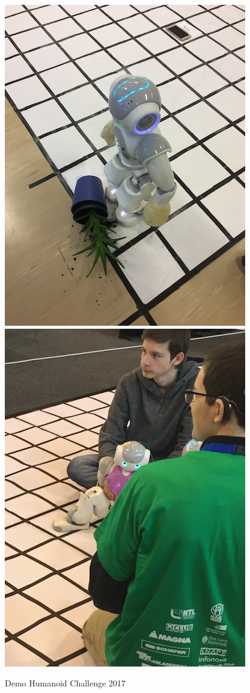 \documentclass[11pt]{article}
\begin{document}
\begin{figure}
\begin{center}
\includegraphics[scale=0.5]{img/RCJTraining.png}
\includegraphics[scale=0.475]{img/RCJ.png}
\end{center}
\caption{Demo Humanoid Challenge 2017}
\label{fig:rcjTraining}
\end{figure}
\end{document}
